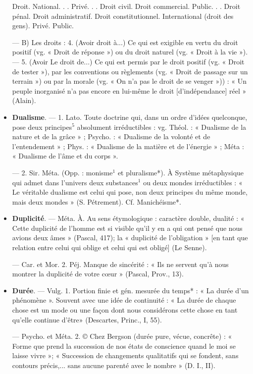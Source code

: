 \begin{itemize}[leftmargin=1cm, label=, itemsep=1pt]
Droit.
  National. . .
    Privé. . .
      Droit civil.
      Droit commercial.
    Public. . .
      Droit pénal.
      Droit administratif.
      Droit constitutionnel.
  International (droit des gens).
    Privé.
    Public.

— B) Les droits : 4. (Avoir droit
à...) Ce qui est exigible en vertu
du droit positif (vg. « Droit de réponse ») ou du droit naturel (vg.
« Droit à la vie »). — 5. (Avoir Le
droit de...) Ce qui est permis par le
droit positif (vg. « Droit de tester »),
par les conventions ou règlements
(vg. « Droit de passage sur un terrain ») ou par la morale (vg. « On
n’a pas le droit de se venger »)) : « Un
peuple inorganisé n’a pas encore en
lui-même le droit [d'indépendance]
réel » (Alain).

\item {\bf Dualisme}. — 1. Lato. Toute doctrine
qui, dans un ordre d'idées quelconque, pose deux principes$^5$ absolument irréductibles : vg. Théol. :
« Dualisme de la nature et de la
grâce » ; Psycho. : « Dualisme de la
volonté et de l’entendement » ;
Phys. : « Dualisme de la matière et
de l’énergie » ; Méta : « Dualisme de
l’âme et du corps ».

— 2. Sir. Méta. (Opp. : monisme$^1$
et pluralisme*). À Système métaphysique qui admet dans l’univers deux
substances$^1$ ou deux mondes irréductibles : « Le véritable dualisme
est celui qui pose, non deux principes du même monde, mais deux
mondes » (S. Pétrement). Cf. Manichéisme*.

\item {\bf Duplicité}. — Méta. À. Au sens étymologique : caractère double, dualité :
« Cette duplicité de l’homme est si
visible qu’il y en a qui ont pensé
que nous avions deux âmes » (Pascal,
417); la « duplicité de l'obligation »
[en tant que relation entre celui qui
oblige et celui qui est obligé] (Le
Senne).

— Car. et Mor. 2. Péj. Manque de
sincérité : « Ils ne servent qu’à nous
montrer la duplicité de votre cœur »
(Pascal, Prov., 13).

\item {\bf Durée}. — Vulg. 1. Portion finie et gén.
mesurée du temps* : « La durée
d'un phénomène ». Souvent avec
une idée de continuité : « La durée
de chaque chose est un mode ou une
façon dont nous considérons cette
chose en tant qu’elle continue d’être»
(Descartes, Princ., I, 55).

— Psycho. et Méta. 2. © Chez
Bergson (durée pure, vécue, concrête) : « Forme que prend la succession de nos états de conscience
quand le moi se laisse vivre »; « Succession de changements qualitatifs
qui se fondent, sans contours précis,... sans aucune parenté avec le
nombre » (D. I., II).


\end{itemize}
